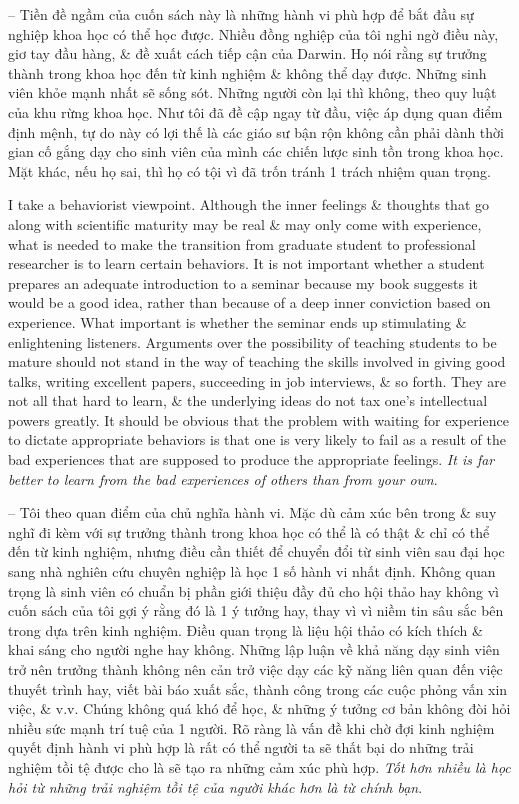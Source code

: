 \documentclass{article}
\begin{document}
\begin{enumerate}
\begin{itemize}
		-- Tiền đề ngầm của cuốn sách này là những hành vi phù hợp để bắt đầu sự nghiệp khoa học có thể học được. Nhiều đồng nghiệp của tôi nghi ngờ điều này, giơ tay đầu hàng, \& đề xuất cách tiếp cận của Darwin. Họ nói rằng sự trưởng thành trong khoa học đến từ kinh nghiệm \& không thể dạy được. Những sinh viên khỏe mạnh nhất sẽ sống sót. Những người còn lại thì không, theo quy luật của khu rừng khoa học. Như tôi đã đề cập ngay từ đầu, việc áp dụng quan điểm định mệnh, tự do này có lợi thế là các giáo sư bận rộn không cần phải dành thời gian cố gắng dạy cho sinh viên của mình các chiến lược sinh tồn trong khoa học. Mặt khác, nếu họ sai, thì họ có tội vì đã trốn tránh 1 trách nhiệm quan trọng.

		I take a behaviorist viewpoint. Although the inner feelings \& thoughts that go along with scientific maturity may be real \& may only come with experience, what is needed to make the transition from graduate student to professional researcher is to learn certain behaviors. It is not important whether a student prepares an adequate introduction to a seminar because my book suggests it would be a good idea, rather than because of a deep inner conviction based on experience. What {\it } important is whether the seminar ends up stimulating \& enlightening listeners. Arguments over the possibility of teaching students to be mature should not stand in the way of teaching the skills involved in giving good talks, writing excellent papers, succeeding in job interviews, \& so forth. They are not all that hard to learn, \& the underlying ideas do not tax one's intellectual powers greatly. It should be obvious that the problem with waiting for experience to dictate appropriate behaviors is that one is very likely to fail as a result of the bad experiences that are supposed to produce the appropriate feelings. {\it It is far better to learn from the bad experiences of others than from your own}.

		-- Tôi theo quan điểm của chủ nghĩa hành vi. Mặc dù cảm xúc bên trong \& suy nghĩ đi kèm với sự trưởng thành trong khoa học có thể là có thật \& chỉ có thể đến từ kinh nghiệm, nhưng điều cần thiết để chuyển đổi từ sinh viên sau đại học sang nhà nghiên cứu chuyên nghiệp là học 1 số hành vi nhất định. Không quan trọng là sinh viên có chuẩn bị phần giới thiệu đầy đủ cho hội thảo hay không vì cuốn sách của tôi gợi ý rằng đó là 1 ý tưởng hay, thay vì vì niềm tin sâu sắc bên trong dựa trên kinh nghiệm. Điều {\it } quan trọng là liệu hội thảo có kích thích \& khai sáng cho người nghe hay không. Những lập luận về khả năng dạy sinh viên trở nên trưởng thành không nên cản trở việc dạy các kỹ năng liên quan đến việc thuyết trình hay, viết bài báo xuất sắc, thành công trong các cuộc phỏng vấn xin việc, \& v.v. Chúng không quá khó để học, \& những ý tưởng cơ bản không đòi hỏi nhiều sức mạnh trí tuệ của 1 người. Rõ ràng là vấn đề khi chờ đợi kinh nghiệm quyết định hành vi phù hợp là rất có thể người ta sẽ thất bại do những trải nghiệm tồi tệ được cho là sẽ tạo ra những cảm xúc phù hợp. {\it Tốt hơn nhiều là học hỏi từ những trải nghiệm tồi tệ của người khác hơn là từ chính bạn}.


\end{itemize}
\end{enumerate}
\end{document}
